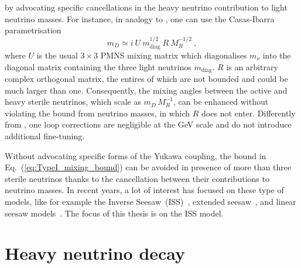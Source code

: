 by advocating specific cancellations in the heavy neutrino contribution to light neutrino masses.
For instance, in analogy to , one can use the Casas-Ibarra parametrisation~\cite{Casas:2001sr}
\begin{equation}
	\label{eq:CasasIbarra}
	m_D \simeq i \ U \ m_\text{diag}^{1/2}\ R\ M_R^{-1/2}\ ,
\end{equation}
where $U$ is the usual $3\times 3$ PMNS mixing matrix %
which diagonalises $m_\nu$ into the diagonal matrix containing the three light neutrinos $m_\text{diag}$.
$R$ is an arbitrary complex orthogonal matrix, the entires of which are not bounded and could be much larger than one.
Consequently, the mixing angles between the active and heavy sterile neutrinos, %
which scale as $m_D\, M_{R}^{-1}$, can be enhanced without violating the bound from neutrino masses, %
in which $R$ does not enter.
Differently from , one loop corrections are negligible at the GeV scale and do not introduce additional fine-tuning. 

Without advocating specific forms of the Yukawa coupling, %
the bound in Eq.~(\ref{eq:TypeI_mixing_bound}) can be avoided in presence of more than three sterile neutrinos %
thanks to the cancellation between their contributions to neutrino masses.
In recent years, a lot of interest has focused on these type of models, like for example %
the Inverse Seesaw~(ISS)~\cite{Mohapatra:1986bd, GonzalezGarcia:1988rw}, extended seesaw~\cite{Barr:2003nn}, %
and linear seesaw models~\cite{Malinsky:2005bi,Kang:2006sn}.
The focus of this thesis is on the ISS model.
\fi





\section{Heavy neutrino decay}
\label{sec:decay}


